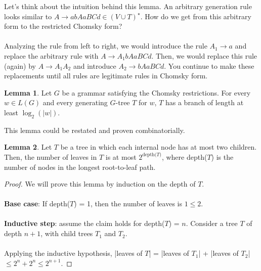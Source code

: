 \documentclass[]{article}
\theoremstyle{definition}
\newtheorem*{lemma}{Lemma}
\begin{document}
      Let's think about the intuition behind this lemma. An arbitrary generation rule looks similar to $A \to abAaBCd \in (V \cup T)^\star$. How do we get from this arbitrary form to the restricted Chomsky form?
      \\ \\
      Analyzing the rule from left to right, we would introduce the rule $A_1 \to a$ and replace the arbitrary rule with $A \to A_1 bAaBCd$. Then, we would replace this rule (again) by $A \to A_1 A_2$ and introduce $A_2 \to bAaBCd$. You continue to make these replacements until all rules are legitimate rules in Chomsky form.

      \begin{lemma}
        \label{lemma2}
        Let $G$ be a grammar satisfying the Chomsky restrictions. For every $w \in L(G)$ and every generating $G$-tree $T$ for $w$, $T$ has a branch of length at least $\log_2(|w|)$.
      \end{lemma}

      This lemma could be restated and proven combinatorially.
      \begin{lemma}
        Let $T$ be a tree in which each internal node has at most two children. Then, the number of leaves in $T$ is at most $2^\text{depth($T$)}$, where depth($T$) is the number of nodes in the longest root-to-leaf path.
      \end{lemma}

      \begin{proof}
        We will prove this lemma by induction on the depth of $T$.
        \\ \\
        \textbf{Base case}: If depth($T$) = 1, then the number of leaves is $1 \le 2$.
        \\ \\
        \textbf{Inductive step}: assume the claim holds for depth($T$) = $n$. Consider a tree $T$ of depth $n + 1$, with child trees $T_1$ and $T_2$.
        \\ \\
        Applying the inductive hypothesis, |leaves of $T$| = |leaves of $T_1$| + |leaves of $T_2$| $\le 2^n + 2^n \le 2^{n + 1}$.
      \end{proof}
\end{document}

